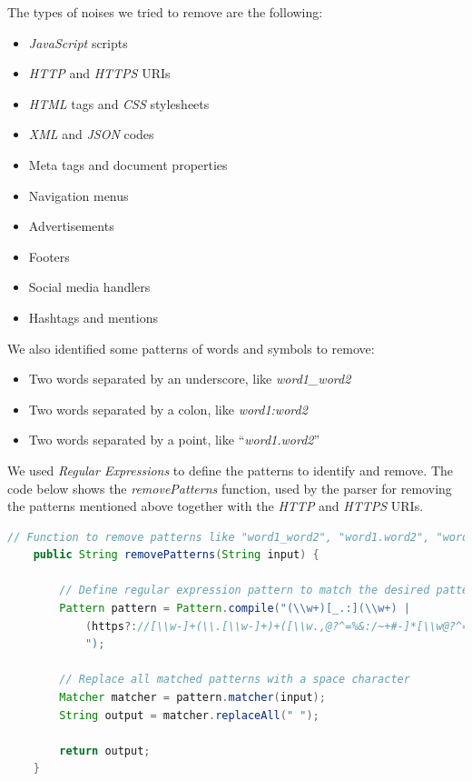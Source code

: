 \newpage
The types of noises we tried to remove are the following:
\begin{itemize}
\item \textit{JavaScript} scripts
\item \textit{HTTP} and \textit{HTTPS} URIs
\item \textit{HTML} tags and \textit{CSS} stylesheets
\item \textit{XML} and \textit{JSON} codes
\item Meta tags and document properties
\item Navigation menus
\item Advertisements
\item Footers
\item Social media handlers
\item Hashtags and mentions
\end{itemize}
We also identified some patterns of words and symbols to remove:
\begin{itemize}
\item Two words separated by an underscore, like \textit{word1\_word2}
\item Two words separated by a colon, like \textit{word1:word2}
\item Two words separated by a point, like ``\textit{word1.word2}''
\end{itemize}
We used \textit{Regular Expressions} to define the patterns to identify and remove. The code below shows the \textit{removePatterns} function, used by the parser for removing the patterns mentioned above together with the \textit{HTTP} and \textit{HTTPS} URIs.
\begin{lstlisting}[language=Java]
    // Function to remove patterns like "word1_word2", "word1.word2", "word1.word2", and HTTP/HTTPS URIs from a string
    public String removePatterns(String input) {

        // Define regular expression pattern to match the desired patterns
        Pattern pattern = Pattern.compile("(\\w+)[_.:](\\w+) |
            (https?://[\\w-]+(\\.[\\w-]+)+([\\w.,@?^=%&:/~+#-]*[\\w@?^=%&/~+#-])?)
            ");
            
        // Replace all matched patterns with a space character
        Matcher matcher = pattern.matcher(input);
        String output = matcher.replaceAll(" ");

        return output;
    }
\end{lstlisting}

